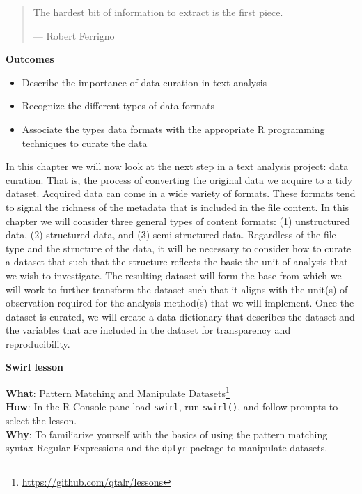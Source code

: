 \documentclass[
  letterpaper,
  DIV=11,
  numbers=noendperiod]{scrreport}
\providecommand{\tightlist}{%
  \setlength{\itemsep}{0pt}\setlength{\parskip}{0pt}}\usepackage{longtable,booktabs,array}
\theoremstyle{definition}
\theoremstyle{remark}
\DeclareRobustCommand{\href}[2]{#2\footnote{\url{#1}}}
\begin{document}
\begin{quote}
The hardest bit of information to extract is the first piece.

--- Robert Ferrigno
\end{quote}

\begin{tcolorbox}[enhanced jigsaw, leftrule=.75mm, bottomrule=.15mm, opacityback=0, breakable, left=2mm, colback=white, toprule=.15mm, arc=.35mm, rightrule=.15mm]

\textbf{ Outcomes}

\begin{itemize}
\tightlist
\item
  Describe the importance of data curation in text analysis
\item
  Recognize the different types of data formats
\item
  Associate the types data formats with the appropriate R programming
  techniques to curate the data
\end{itemize}

\end{tcolorbox}

In this chapter we will now look at the next step in a text analysis
project: data curation. That is, the process of converting the original
data we acquire to a tidy dataset. Acquired data can come in a wide
variety of formats. These formats tend to signal the richness of the
metadata that is included in the file content. In this chapter we will
consider three general types of content formats: (1) unstructured data,
(2) structured data, and (3) semi-structured data. Regardless of the
file type and the structure of the data, it will be necessary to
consider how to curate a dataset that such that the structure reflects
the basic the unit of analysis that we wish to investigate. The
resulting dataset will form the base from which we will work to further
transform the dataset such that it aligns with the unit(s) of
observation required for the analysis method(s) that we will implement.
Once the dataset is curated, we will create a data dictionary that
describes the dataset and the variables that are included in the dataset
for transparency and reproducibility.

\begin{tcolorbox}[enhanced jigsaw, leftrule=.75mm, bottomrule=.15mm, opacityback=0, breakable, left=2mm, colback=white, toprule=.15mm, arc=.35mm, rightrule=.15mm]

\textbf{ Swirl lesson}

\textbf{What}: \href{https://github.com/qtalr/lessons}{Pattern Matching
and Manipulate Datasets}\\
\textbf{How}: In the R Console pane load \texttt{swirl}, run
\texttt{swirl()}, and follow prompts to select the lesson.\\
\textbf{Why}: To familiarize yourself with the basics of using the
pattern matching syntax Regular Expressions and the \texttt{dplyr}
package to manipulate datasets.

\end{tcolorbox}
\end{document}
